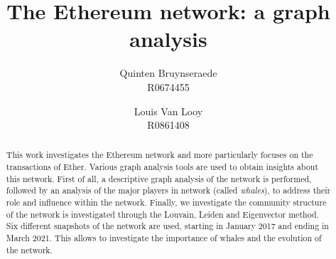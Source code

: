\documentclass[10pt,a4paper]{article}
\author{Quinten Bruynseraede  \\ R0674455 \and Louis Van Looy \\ R0861408}
\title{The Ethereum network: a graph analysis}
\begin{document}
\maketitle

\begin{abstract}
	
This work investigates the Ethereum network and more particularly focuses on the transactions of Ether. Various graph analysis tools are used to obtain insights about this network. First of all, a descriptive graph analysis of the network is performed, followed by an analysis of the major players in network (called \textit {whales}), to address their role and influence within the network. Finally, we investigate the community structure of the network is investigated through the Louvain, Leiden and Eigenvector method. Six different snapshots of the network are used, starting in January 2017 and ending in March 2021. This allows to investigate the importance of whales and the evolution of the network.

\end{abstract}
\end{document}
